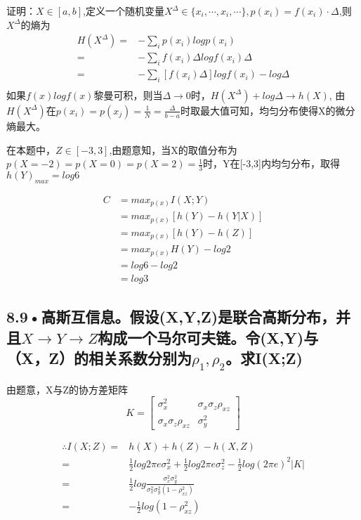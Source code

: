 \documentclass[UTF8]{ctexart}
\begin{document}
证明：$X\in [a, b]$,定义一个随机变量$X^{\Delta}\in \{x_i,\cdots ,x_i,\cdots\}, p(x_i)=f(x_i)\cdot\Delta$,则$X^{\Delta}$的熵为
\begin{equation*}
    \begin{split}
        H(X^\Delta)=&-\sum _ip(x_i)log p(x_i)\\
        =& -\sum _if(x_i)\Delta log f(x_i)\Delta\\
        =&-\sum _i[f(x_i)\Delta ] log f(x_i) -log \Delta\\
    \end{split}
\end{equation*}
如果$f(x)logf(x)$黎曼可积，则当$\Delta \rightarrow 0$时，$H(X^\Delta)+log\Delta \rightarrow h(X)$, 由$H(X^\Delta)$在$p(x_i)=p(x_j)=\frac{1}{N}=\frac{\Delta}{b-a}$时取最大值可知，均匀分布使得X的微分熵最大。

在本题中，$Z\in[-3, 3]$,由题意知，当X的取值分布为$p(X=-2)=p(X=0)=p(X=2)=\frac{1}{3}$时，Y在[-3,3]内均匀分布，取得$h(Y)_{max}=log6$

\begin{equation*}
    \begin{split}
        C & = max_{p(x)} I(X; Y)\\
        & = max_{p(x)}[h(Y)-h(Y|X)]\\
        & = max_{p(x)}[h(Y)-h(Z)]\\
        & = max_{p(x)}H(Y) - log2\\
        & = log6 - log2\\
        & = log3
    \end{split}
\end{equation*}
\subsection*{8.9•高斯互信息。假设(X,Y,Z)是联合高斯分布，并且$X\rightarrow Y\rightarrow Z$构成一个马尔可夫链。令(X,Y)与（X，Z）的相关系数分别为$\rho _1, \rho _2$。求I(X;Z)}
由题意，X与Z的协方差矩阵
\[
    K = \begin{bmatrix}
     \sigma_x^2 & \sigma_x\sigma_z\rho_{xz} \\
     \sigma_x\sigma_z\rho_{xz}& \sigma_y^2
    \end{bmatrix}
\]

\begin{equation*}
     \begin{split}
        \therefore I(X;Z)=& h(X)+h(Z)-h(X,Z)\\
        =& \frac{1}{2}log 2\pi e\sigma_x^2+\frac{1}{2}log 2\pi e\sigma_z^2-\frac{1}{2}log (2\pi e)^2|K|\\
        =&\frac{1}{2}log \frac{\sigma_x^2\sigma_y^2}{\sigma_x^2\sigma_y^2(1-\rho_{xz}^2)}\\
        =&-\frac{1}{2}log (1-\rho_{xz}^2)
    \end{split}
\end{equation*}
\end{document}
